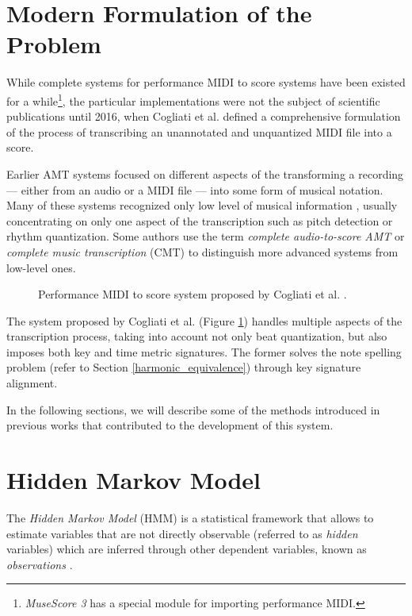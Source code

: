 \section{Modern Formulation of the Problem}

While complete systems for performance MIDI to score systems have been existed for a while\footnote{\emph{MuseScore 3} has a special module for importing performance MIDI.}, the particular implementations were not the subject of scientific publications until 2016, when Cogliati et al. defined a comprehensive formulation of the process of transcribing an unannotated and unquantized MIDI file into a score. 

Earlier AMT systems focused on different aspects of the transforming a recording --- either from an audio or a MIDI file --- into some form of musical notation. Many of these systems recognized only low level of musical information \cite{Cogliati2016}, usually concentrating on only one aspect of the transcription such as pitch detection or rhythm quantization. Some authors use the term \emph{complete audio-to-score AMT} \cite{Foscarin2020} or \emph{complete music transcription} (CMT) \cite{Ycart2018} to distinguish more advanced systems from low-level ones.

\begin{figure}[!ht]
\centering

\caption[Performance MIDI to score system proposed by Cogliati et al.]{Performance MIDI to score system proposed by Cogliati et al. \cite{Cogliati2016}.}
\label{transcription_system}
\end{figure}

The system proposed by Cogliati et al. (Figure \ref{transcription_system}) handles multiple aspects of the transcription process, taking into account not only beat quantization, but also imposes both key and time metric signatures. The former solves the note spelling problem (refer to Section \ref{harmonic_equivalence}) through key signature alignment.

In the following sections, we will describe some of the methods introduced in previous works that contributed to the development of this system.

\section{Hidden Markov Model}

The \emph{Hidden Markov Model} (HMM) is a statistical framework that allows to estimate variables that are not directly observable (referred to as \emph{hidden} variables) which are inferred through other dependent variables, known as \emph{observations} \cite[p. 210--213]{Jurafsky2009}.

